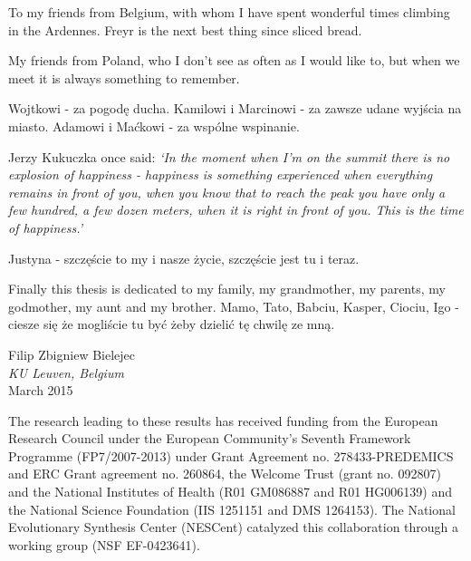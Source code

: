 To my friends from Belgium, with whom I have spent wonderful times climbing in the Ardennes. 
Freyr is the next best thing since sliced bread.

My friends from Poland, who I don't see as often as I would like to, but when we meet it is always something to remember. 

Wojtkowi - za pogod\k{e} ducha. 
Kamilowi i Marcinowi - za zawsze udane wyj\'{s}cia na miasto.
Adamowi i Ma\'{c}kowi - za wsp\'{o}lne wspinanie.

Jerzy Kukuczka once said:
\emph{`In the moment when I'm on the summit there is no explosion of happiness - happiness is something experienced when everything remains in front of you, when you know that to reach the peak you have only a few hundred, a few dozen meters, when it is right in front of you. This is the time of happiness.'} 

Justyna - szcz\k{e}\'{s}cie to my i nasze \.{z}ycie, szcz\k{e}\'{s}cie jest tu i teraz. 

Finally this thesis is dedicated to my family, my grandmother, my parents, my godmother, my aunt and my brother. 
Mamo, Tato, Babciu, Kasper, Ciociu, Igo - ciesze si\k{e} \.{z}e mogli\'{s}cie tu by\'{c} \.{z}eby
dzieli\'{c} t\k{e} chwil\k{e} ze mn\k{a}. 

\begin{flushright}
Filip Zbigniew Bielejec \\
\textit{KU Leuven, Belgium} \\
March 2015
\par\end{flushright}

\vfill{}

The research leading to these results has received funding from the European Research Council under the European Community's Seventh Framework Programme (FP7/2007-2013) under Grant Agreement no. 278433-PREDEMICS and ERC Grant agreement no. 260864, the Welcome Trust (grant no. 092807) and the National Institutes of Health (R01 GM086887 and R01 HG006139) and the National Science Foundation (IIS 1251151 and DMS 1264153).
The National Evolutionary Synthesis Center (NESCent) catalyzed this collaboration through a working group (NSF EF-0423641).

